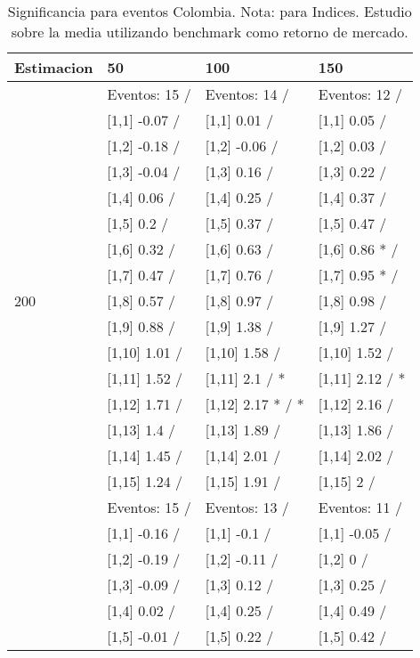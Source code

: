 \begin{table}

\caption{Significancia para eventos Colombia. Nota: para Indices. Estudio sobre la media utilizando benchmark como retorno de mercado.}
\centering
\begin{tabular}[t]{llll}
\toprule
Estimacion & 50 & 100 & 150\\
\midrule
 & Eventos:  15 / & Eventos:  14 / & Eventos:  12 /\\
 & {}[1,1] -0.07  / & {}[1,1] 0.01  / & {}[1,1] 0.05  /\\
 & {}[1,2] -0.18  / & {}[1,2] -0.06  / & {}[1,2] 0.03  /\\
 & {}[1,3] -0.04  / & {}[1,3] 0.16  / & {}[1,3] 0.22  /\\
 & {}[1,4] 0.06  / & {}[1,4] 0.25  / & {}[1,4] 0.37  /\\
\addlinespace
 & {}[1,5] 0.2  / & {}[1,5] 0.37  / & {}[1,5] 0.47  /\\
 & {}[1,6] 0.32  / & {}[1,6] 0.63  / & {}[1,6] 0.86 * /\\
 & {}[1,7] 0.47  / & {}[1,7] 0.76  / & {}[1,7] 0.95 * /\\
200 & {}[1,8] 0.57  / & {}[1,8] 0.97  / & {}[1,8] 0.98  /\\
 & {}[1,9] 0.88  / & {}[1,9] 1.38  / & {}[1,9] 1.27  /\\
\addlinespace
 & {}[1,10] 1.01  / & {}[1,10] 1.58  / & {}[1,10] 1.52  /\\
 & {}[1,11] 1.52  / & {}[1,11] 2.1  / * & {}[1,11] 2.12  / *\\
 & {}[1,12] 1.71  / & {}[1,12] 2.17 * / * & {}[1,12] 2.16  /\\
 & {}[1,13] 1.4  / & {}[1,13] 1.89  / & {}[1,13] 1.86  /\\
 & {}[1,14] 1.45  / & {}[1,14] 2.01  / & {}[1,14] 2.02  /\\
\addlinespace
 & {}[1,15] 1.24  / & {}[1,15] 1.91  / & {}[1,15] 2  /\\
 & Eventos:  15 / & Eventos:  13 / & Eventos:  11 /\\
 & {}[1,1] -0.16  / & {}[1,1] -0.1  / & {}[1,1] -0.05  /\\
 & {}[1,2] -0.19  / & {}[1,2] -0.11  / & {}[1,2] 0  /\\
 & {}[1,3] -0.09  / & {}[1,3] 0.12  / & {}[1,3] 0.25  /\\
\addlinespace
 & {}[1,4] 0.02  / & {}[1,4] 0.25  / & {}[1,4] 0.49  /\\
 & {}[1,5] -0.01  / & {}[1,5] 0.22  / & {}[1,5] 0.42  /\\

\end{tabular}
\end{table}
